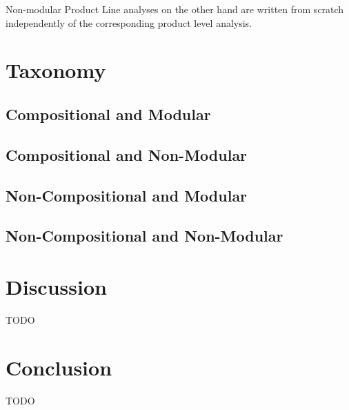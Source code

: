 \documentclass{article}
\begin{document}
Non-modular Product Line analyses on the other hand are written from scratch independently of the corresponding product level analysis.

\section{Taxonomy}

\subsection{Compositional and Modular}

\subsection{Compositional and Non-Modular}

\subsection{Non-Compositional and Modular}

\subsection{Non-Compositional and Non-Modular}

\section{Discussion}
TODO

\section{Conclusion}
TODO


 
\end{document}
